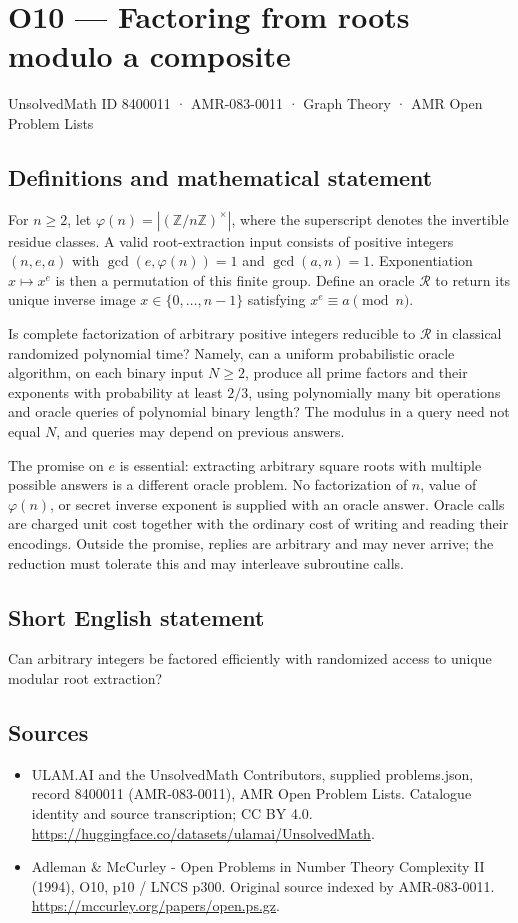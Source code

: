 \documentclass[11pt,a4paper]{article}
\begin{document}
\section*{O10 — Factoring from roots modulo a composite}\label{8400011}
{\small UnsolvedMath ID 8400011 · AMR-083-0011 · Graph Theory · AMR Open Problem Lists}
\subsection{Definitions and mathematical statement}
For $n\ge2$, let $\varphi(n)=|(\mathbb Z/n\mathbb Z)^\times|$, where the superscript denotes the invertible residue classes. A valid root-extraction input consists of positive integers $(n,e,a)$ with $\gcd(e,\varphi(n))=1$ and $\gcd(a,n)=1$. Exponentiation $x\mapsto x^e$ is then a permutation of this finite group. Define an oracle $\mathcal R$ to return its unique inverse image $x\in\{0,\ldots,n-1\}$ satisfying $x^e\equiv a\pmod n$.

Is complete factorization of arbitrary positive integers reducible to $\mathcal R$ in classical randomized polynomial time? Namely, can a uniform probabilistic oracle algorithm, on each binary input $N\ge2$, produce all prime factors and their exponents with probability at least $2/3$, using polynomially many bit operations and oracle queries of polynomial binary length? The modulus in a query need not equal $N$, and queries may depend on previous answers.

The promise on $e$ is essential: extracting arbitrary square roots with multiple possible answers is a different oracle problem. No factorization of $n$, value of $\varphi(n)$, or secret inverse exponent is supplied with an oracle answer. Oracle calls are charged unit cost together with the ordinary cost of writing and reading their encodings. Outside the promise, replies are arbitrary and may never arrive; the reduction must tolerate this and may interleave subroutine calls.
\subsection{Short English statement}
Can arbitrary integers be factored efficiently with randomized access to unique modular root extraction?
\subsection{Sources}
\begin{itemize}
\item[S1] ULAM.AI and the UnsolvedMath Contributors, supplied problems.json, record 8400011 (AMR-083-0011), AMR Open Problem Lists. Catalogue identity and source transcription; CC BY 4.0.
\url{https://huggingface.co/datasets/ulamai/UnsolvedMath}.
\item[S2] Adleman \& McCurley - Open Problems in Number Theory Complexity II (1994), O10, p10 / LNCS p300. Original source indexed by AMR-083-0011.
\url{https://mccurley.org/papers/open.ps.gz}.
\end{itemize}
\end{document}
